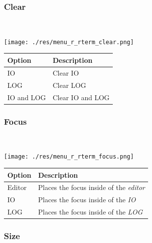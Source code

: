 \subsubsection{Clear}\\

\texttt{[image: ./res/menu\_r\_rterm\_clear.png]}\\

\begin{scriptsize}
  \begin{tabularx}{\textwidth}{>{\hsize=0.3\hsize}X>{\hsize=0.7\hsize}X}\\
    \hline
    \textbf{Option} & \textbf{Description} \\
    \hline
    IO & Clear IO \\
    LOG & Clear LOG \\
    IO and LOG & Clear IO and LOG \\
    \hline
  \end{tabularx}
\end{scriptsize}


\hypertarget{menu_r_rterm_focus}{}
\subsubsection{Focus}\\

\texttt{[image: ./res/menu\_r\_rterm\_focus.png]}\\

\begin{scriptsize}
  \begin{tabularx}{\textwidth}{>{\hsize=0.3\hsize}X>{\hsize=0.7\hsize}X}\\
    \hline
    \textbf{Option} & \textbf{Description} \\
    \hline
    Editor & Places the focus inside of the \textit{editor} \\
    IO & Places the focus inside of the \textit{IO} \\
    LOG & Places the focus inside of the \textit{LOG} \\
    \hline
  \end{tabularx}
\end{scriptsize}


\hypertarget{menu_r_rterm_size}{}
\subsubsection{Size}\\

